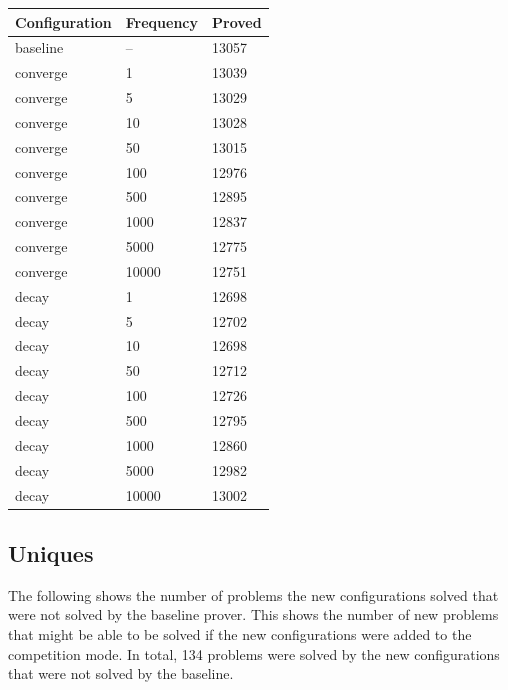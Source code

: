 \documentclass{llncs}
\begin{document}
\begin{center}
\begin{tabular}{l l l}
	Configuration & Frequency & Proved\\
	\hline
	baseline & -- & 13057\\
	\hline
	converge & 1 & 13039\\
	converge & 5 & 13029\\
	converge & 10 & 13028\\
	converge & 50 & 13015\\
	converge & 100 & 12976\\
	converge & 500 & 12895\\
	converge & 1000 & 12837\\
	converge & 5000 & 12775\\
	converge & 10000 & 12751\\
	\hline
	decay & 1 & 12698\\
	decay & 5 & 12702\\
	decay & 10 & 12698\\
	decay & 50 & 12712\\
	decay & 100 & 12726\\
	decay & 500 & 12795\\
	decay & 1000 & 12860\\
	decay & 5000 & 12982\\
	decay & 10000 & 13002\\
\end{tabular}
\end{center}

\subsection{Uniques}
The following shows the number of problems the new configurations solved that were not solved by the baseline prover.
This shows the number of new problems that might be able to be solved if the new configurations were added to the competition mode.
In total, 134 problems were solved by the new configurations that were not solved by the baseline.
\end{document}
